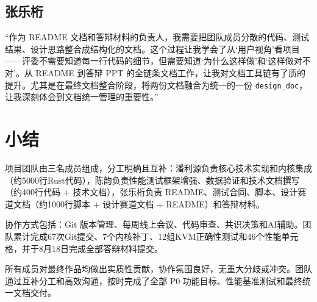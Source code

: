 \subsection{张乐桁}
“作为 README 文档和答辩材料的负责人，我需要把团队成员分散的代码、测试结果、设计思路整合成结构化的文档。这个过程让我学会了从‘用户视角’看项目——评委不需要知道每一行代码的细节，但需要知道‘为什么这样做’和‘这样做对不对’。从 README 到答辩 PPT 的全链条文档工作，让我对文档工具链有了质的提升。尤其是在最终文档整合阶段，将两份文档融合为统一的一份 \texttt{design\_doc}，让我深刻体会到文档统一管理的重要性。”

\section{小结}

项目团队由三名成员组成，分工明确且互补：潘利源负责核心技术实现和内核集成（约5000行Rust代码），陈韵负责性能测试框架增强、数据验证和技术文档撰写（约400行代码 + 技术文档），张乐桁负责 README、测试合同、脚本、设计赛道文档（约1000行脚本 + 设计赛道文档 + README）和答辩材料。

协作方式包括：Git 版本管理、每周线上会议、代码审查、共识决策和AI辅助。团队累计完成67次Git提交、7个内核补丁、12组KVM正确性测试和46个性能单元格，并于8月18日完成全部答辩材料提交。

所有成员对最终作品均做出实质性贡献，协作氛围良好，无重大分歧或冲突。团队通过互补分工和高效沟通，按时完成了全部 P0 功能目标、性能基准测试和最终统一文档交付。